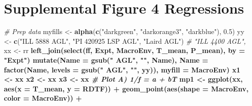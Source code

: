 \documentclass[
]{article}
\newenvironment{Shaded}{\begin{snugshade}}{\end{snugshade}}
\newcommand{\CommentTok}[1]{\textcolor[rgb]{0.56,0.35,0.01}{\textit{#1}}}
\newcommand{\DataTypeTok}[1]{\textcolor[rgb]{0.13,0.29,0.53}{#1}}
\newcommand{\FloatTok}[1]{\textcolor[rgb]{0.00,0.00,0.81}{#1}}
\newcommand{\KeywordTok}[1]{\textcolor[rgb]{0.13,0.29,0.53}{\textbf{#1}}}
\newcommand{\NormalTok}[1]{#1}
\newcommand{\OperatorTok}[1]{\textcolor[rgb]{0.81,0.36,0.00}{\textbf{#1}}}
\newcommand{\StringTok}[1]{\textcolor[rgb]{0.31,0.60,0.02}{#1}}
\begin{document}
\hypertarget{supplemental-figure-4-regressions}{%
\section{Supplemental Figure 4
Regressions}\label{supplemental-figure-4-regressions}}

\begin{Shaded}
\begin{Highlighting}[]
\CommentTok{# Prep data}
\NormalTok{myfills <-}\StringTok{ }\KeywordTok{alpha}\NormalTok{(}\KeywordTok{c}\NormalTok{(}\StringTok{"darkgreen"}\NormalTok{, }\StringTok{"darkorange3"}\NormalTok{, }\StringTok{"darkblue"}\NormalTok{), }\FloatTok{0.5}\NormalTok{)}
\NormalTok{yy <-}\StringTok{ }\KeywordTok{c}\NormalTok{(}\StringTok{"ILL 5888 AGL"}\NormalTok{, }\StringTok{"PI 420925 LSP AGL"}\NormalTok{,  }\StringTok{"Laird AGL"}\NormalTok{) }\CommentTok{# "ILL 4400 AGL",}
\NormalTok{xx <-}\StringTok{ }\NormalTok{rr }\OperatorTok{%
\StringTok{  }\KeywordTok{left_join}\NormalTok{(}\KeywordTok{select}\NormalTok{(ff, Expt, MacroEnv, T_mean, P_mean), }\DataTypeTok{by =} \StringTok{"Expt"}\NormalTok{) }\OperatorTok{%
\StringTok{  }\KeywordTok{mutate}\NormalTok{(}\DataTypeTok{Name =} \KeywordTok{gsub}\NormalTok{(}\StringTok{" AGL"}\NormalTok{, }\StringTok{""}\NormalTok{, Name),}
         \DataTypeTok{Name =} \KeywordTok{factor}\NormalTok{(Name, }\DataTypeTok{levels =} \KeywordTok{gsub}\NormalTok{(}\StringTok{" AGL"}\NormalTok{, }\StringTok{""}\NormalTok{, yy)),}
         \DataTypeTok{myfill =}\NormalTok{ MacroEnv)}
\NormalTok{x1 <-}\StringTok{ }\NormalTok{xx }\OperatorTok{%
\NormalTok{x2 <-}\StringTok{ }\NormalTok{xx }\OperatorTok{%
\NormalTok{x3 <-}\StringTok{ }\NormalTok{xx }\OperatorTok{%
\CommentTok{# Plot A) 1/f = a + bT}
\NormalTok{mp1 <-}\StringTok{ }\KeywordTok{ggplot}\NormalTok{(xx, }\KeywordTok{aes}\NormalTok{(}\DataTypeTok{x =}\NormalTok{ T_mean, }\DataTypeTok{y =}\NormalTok{ RDTF)) }\OperatorTok{+}
\StringTok{  }\KeywordTok{geom_point}\NormalTok{(}\KeywordTok{aes}\NormalTok{(}\DataTypeTok{shape =}\NormalTok{ MacroEnv, }\DataTypeTok{color =}\NormalTok{ MacroEnv)) }\OperatorTok{+}
}}}}}
\end{Highlighting}
\end{Shaded}
\end{document}
